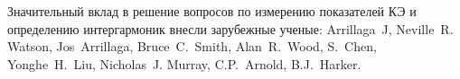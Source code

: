 

Значительный вклад в решение вопросов по измерению показателей КЭ и определению интергармоник внесли зарубежные ученые: Arrillaga~J, Neville~R. Watson, Jos~Arrillaga, Bruce~C.~Smith, Alan~R.~Wood, S.~Chen, Yonghe~H.~Liu, Nicholas~J. Murray, C.P.~Arnold, B.J.~Harker.


\newcommand{\progress}{}
\newcommand{\aim}{{\textbf\aimTXT}}
\newcommand{\tasks}{\textbf{\tasksTXT}}
\newcommand{\novelty}{\textbf{\noveltyTXT}}
\newcommand{\influence}{\textbf{\influenceTXT}}
\newcommand{\methods}{\textbf{\methodsTXT}}
\newcommand{\defpositions}{\textbf{\defpositionsTXT}}
\newcommand{\reliability}{\textbf{\reliabilityTXT}}
\newcommand{\probation}{\textbf{\probationTXT}}
\newcommand{\contribution}{\textbf{\contributionTXT}}
\newcommand{\publications}{\textbf{\publicationsTXT}}


